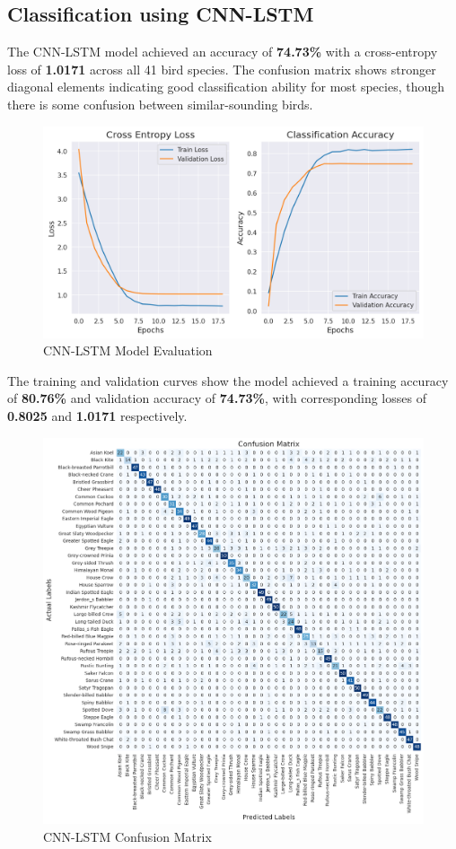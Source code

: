 \subsection{Classification using CNN-LSTM}
The CNN-LSTM model achieved an accuracy of \textbf{74.73\%} with a cross-entropy loss of \textbf{1.0171} across all 41 bird species. The confusion matrix shows stronger diagonal elements indicating good classification ability for most species, though there is some confusion between similar-sounding birds.
\begin{figure}[h!]
      \centering
      \includegraphics[scale=0.6]{images/cnn_lstm_evaluation.png}
      \caption{CNN-LSTM Model Evaluation}
  \end{figure}
      The training and validation curves show the model achieved a training accuracy of \textbf{80.76\%} and validation accuracy of \textbf{74.73\%}, with corresponding losses of \textbf{0.8025} and \textbf{1.0171} respectively.
\newpage
\begin{figure}[h!]
      \centering
      \includegraphics[scale=0.5]{images/cnn_lstm_confusion_matrix.png}
      \caption{CNN-LSTM Confusion Matrix}
  \end{figure}
